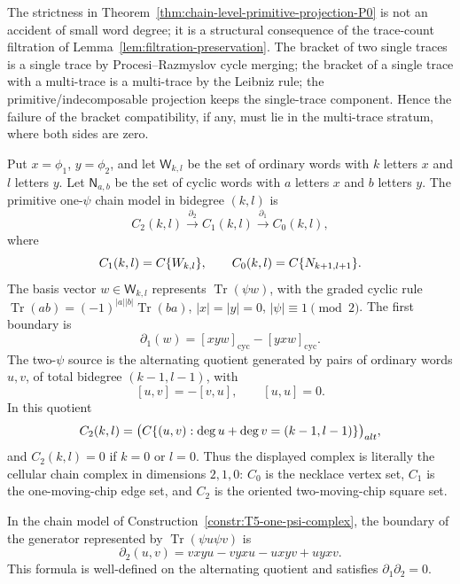 \begin{rmk}\label{rmk:why-homotopy-zero}
  The strictness in
  Theorem~\ref{thm:chain-level-primitive-projection-P0} is not an
  accident of small word degree; it is a structural consequence of
  the trace-count filtration of
  Lemma~\ref{lem:filtration-preservation}.  The bracket of two single
  traces is a single trace by Procesi--Razmyslov cycle merging; the
  bracket of a single trace with a multi-trace is a multi-trace by
  the Leibniz rule; the primitive/indecomposable projection keeps the
  single-trace component.  Hence the failure of the bracket compatibility, if any,
  must lie in the multi-trace stratum, where both sides are zero.
  \end{rmk}

\begin{constr}\label{constr:T5-one-psi-complex}
  Put \(x=\phi_1\), \(y=\phi_2\), and let
  \(\mathsf W_{k,l}\) be the set of ordinary words with \(k\) letters
  \(x\) and \(l\) letters \(y\).  Let \(\mathsf N_{a,b}\) be the set of
  cyclic words with \(a\) letters \(x\) and \(b\) letters \(y\).  The
  primitive one-\(\psi\) chain model in bidegree \((k,l)\) is
  \[
    C_2(k,l)\xrightarrow{\partial_2}C_1(k,l)
      \xrightarrow{\partial_1}C_0(k,l),
  \]
  where
  \[
    C_1(k,l)=C\{W_{k,l}\},\qquad
    C_0(k,l)=C\{N_{k+1,l+1}\}.
  \]
	  The basis vector \(w\in\mathsf W_{k,l}\) represents
	  \(\operatorname{Tr}(\psi w)\), with the graded cyclic rule
	  \(\operatorname{Tr}(ab)=(-1)^{|a||b|}\operatorname{Tr}(ba)\),
	  \(|x|=|y|=0\), \(|\psi|\equiv1\pmod2\).  The first boundary is
  \[
    \partial_1(w)=[xyw]_{\mathrm{cyc}}-[yxw]_{\mathrm{cyc}}.
  \]
  The two-\(\psi\) source is the alternating quotient generated by pairs
  of ordinary words \(u,v\), of total bidegree \((k-1,l-1)\), with
  \[
    [u,v]=-[v,u],\qquad [u,u]=0.
  \]
  In this quotient
  \[
    C_2(k,l)=
    \bigl(C\{(u,v):\deg u+\deg v=(k-1,l-1)\}\bigr)_{alt},
  \]
  and \(C_2(k,l)=0\) if \(k=0\) or \(l=0\).
  Thus the displayed complex is literally the cellular chain complex in
  dimensions \(2,1,0\): \(C_0\) is the necklace vertex set,
  \(C_1\) is the one-moving-chip edge set, and \(C_2\) is the oriented
  two-moving-chip square set.
\end{constr}

\begin{lem}\label{lem:T5-two-psi-boundary-sign}
  In the chain model of
  Construction~\ref{constr:T5-one-psi-complex}, the boundary of the
  generator represented by \(\operatorname{Tr}(\psi u\psi v)\) is
  \[
    \partial_2(u,v)=vxyu-vyxu-uxyv+uyxv.
  \]
  This formula is well-defined on the alternating quotient and satisfies
  \(\partial_1\partial_2=0\).
\end{lem}

